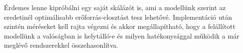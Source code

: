 Érdemes lenne kipróbálni egy saját skálázót is, ami a modellünk szerint az eredetinél optimálisabb erőforrás-elosztást tesz lehetővé.
Implementáció után szintén méréseket kell rajta végezni és akkor megállapítható, hogy a felállított modellünk a valóságban is helytálló-e és milyen hatékonysággal működik a már meglévő rendszerekkel összehasonlítva. 
